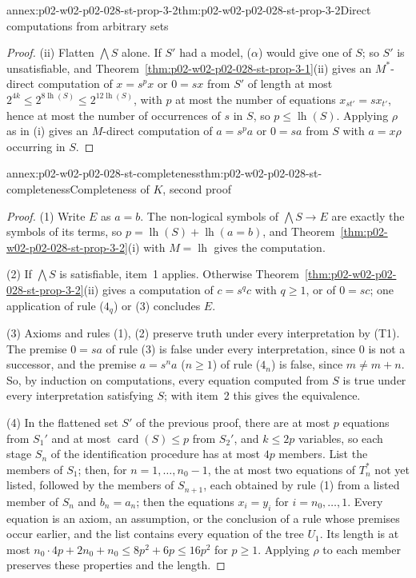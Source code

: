 \begin{annexitem}{annex:p02-w02-p02-028-st-prop-3-2}{thm:p02-w02-p02-028-st-prop-3-2}{Direct computations from arbitrary sets}
\begin{proof}
(ii)  Flatten \(\bigwedge S\) alone.  If \(S'\) had a model, (\(\alpha\))
would give one of \(S\); so \(S'\) is unsatisfiable, and
Theorem~\ref{thm:p02-w02-p02-028-st-prop-3-1}(ii) gives an \(M^*\)-direct
computation of \(x=s^px\) or \(0=sx\) from \(S'\) of length at most
\(2^{4k}\leq2^{8\operatorname{lh}(S)}\leq2^{12\operatorname{lh}(S)}\), with
\(p\) at most the number of equations \(x_{st'}=sx_{t'}\), hence at most the
number of occurrences of \(s\) in \(S\), so \(p\leq\operatorname{lh}(S)\).
Applying \(\rho\) as in (i) gives an \(M\)-direct computation of
\(a=s^pa\) or \(0=sa\) from \(S\) with \(a=x\rho\) occurring in \(S\).
\end{proof}
\end{annexitem}

\begin{annexitem}{annex:p02-w02-p02-028-st-completeness}{thm:p02-w02-p02-028-st-completeness}{Completeness of \(K\), second proof}
\begin{proof}
(1) Write \(E\) as \(a=b\).  The non-logical symbols of
\(\bigwedge S\to E\) are exactly the symbols of its terms, so
\(p=\operatorname{lh}(S)+\operatorname{lh}(a=b)\), and
Theorem~\ref{thm:p02-w02-p02-028-st-prop-3-2}(i) with \(M=\operatorname{lh}\)
gives the computation.

(2) If \(\bigwedge S\) is satisfiable, item~1 applies.  Otherwise
Theorem~\ref{thm:p02-w02-p02-028-st-prop-3-2}(ii) gives a computation of
\(c=s^qc\) with \(q\geq1\), or of \(0=sc\); one application of rule (\(4_q\))
or (3) concludes \(E\).

(3) Axioms and rules (1), (2) preserve truth under every interpretation by
(T1).  The premise \(0=sa\) of rule (3) is false under every interpretation,
since \(0\) is not a successor, and the premise \(a=s^na\) (\(n\geq1\)) of
rule (\(4_n\)) is false, since \(m\neq m+n\).  So, by induction on
computations, every equation computed from \(S\) is true under every
interpretation satisfying \(S\); with item~2 this gives the equivalence.

(4) In the flattened set \(S'\) of the previous proof, there are at most
\(p\) equations from \(S_1'\) and at most \(\operatorname{card}(S)\leq p\)
from \(S_2'\), and \(k\leq2p\) variables, so each stage \(S_n\) of the
identification procedure has at most \(4p\) members.  List the members of
\(S_1\); then, for \(n=1,\ldots,n_0-1\), the at most two equations of
\(T^*_n\) not yet listed, followed by the members of \(S_{n+1}\), each
obtained by rule (1) from a listed member of \(S_n\) and \(b_n=a_n\); then the
equations \(x_i=y_i\) for \(i=n_0,\ldots,1\).  Every equation is an axiom,
an assumption, or the conclusion of a rule whose premises occur earlier, and
the list contains every equation of the tree \(U_1\).  Its length is at most
\(n_0\cdot4p+2n_0+n_0\leq8p^2+6p\leq16p^2\) for \(p\geq1\).  Applying
\(\rho\) to each member preserves these properties and the length.
\end{proof}
\end{annexitem}

